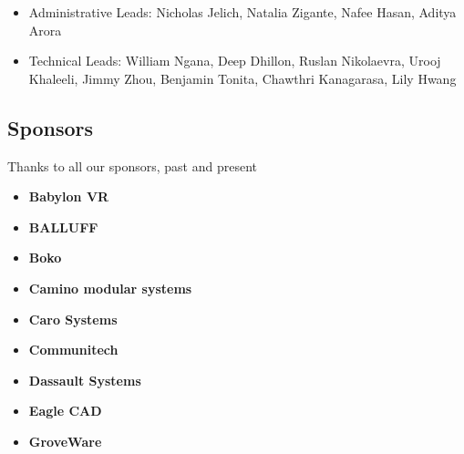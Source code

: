 \documentclass[main.tex]{subfiles}
\begin{document}
\begin{itemize}
    \item Administrative Leads: Nicholas Jelich, Natalia Zigante, Nafee Hasan, Aditya Arora
    \item Technical Leads: William Ngana, Deep Dhillon, Ruslan Nikolaevra, Urooj Khaleeli, Jimmy Zhou, Benjamin Tonita, Chawthri Kanagarasa, Lily Hwang
\end{itemize}
\begin{flushleft}
\subsection{Sponsors}
Thanks to all our sponsors, past and present

\begin{multicols}{3}
    \begin{itemize}[label={},noitemsep]
    \item \textbf{Babylon VR}
    \end{itemize}
    \columnbreak
    \begin{itemize}[label={},noitemsep]
    \item \textbf{BALLUFF}
    \end{itemize}
    \columnbreak
    \begin{itemize}[label={},noitemsep]
    \item \textbf{Boko}
    \end{itemize}
\end{multicols}

\begin{multicols}{3}
\begin{itemize}[label={},noitemsep]
    \item \textbf{Camino modular systems}
    \end{itemize}
    \columnbreak
    \begin{itemize}[label={},noitemsep]
    \item \textbf{Caro Systems}
    \end{itemize}
    \columnbreak
    \begin{itemize}[label={},noitemsep]
    \item \textbf{Communitech}
    \end{itemize}
    \columnbreak
\end{multicols}

\begin{multicols}{3}
\begin{itemize}[label={},noitemsep]
    \item \textbf{Dassault Systems}
    \end{itemize}
    \columnbreak
    \begin{itemize}[label={},noitemsep]
    \item \textbf{Eagle CAD}
    \end{itemize}
    \columnbreak
    \begin{itemize}[label={},noitemsep]
    \item \textbf{GroveWare}
    \end{itemize}
    \columnbreak
\end{multicols}


\end{flushleft}
\end{document}
